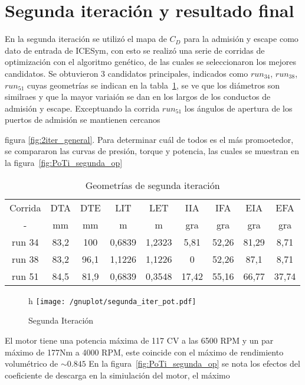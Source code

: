 \section{Segunda iteración y resultado final}
%
En la segunda iteración se utilizó el mapa de $C_D$ para la admisión y escape
como dato de entrada de ICESym, con esto se realizó una serie de corridas de
optimización con el algoritmo genético, de las cuales se seleccionaron los
mejores candidatos.
%
Se obtuvieron 3 candidatos principales, indicados como \emph{$run_{34}$},
\emph{$run_{38}$}, \emph{$run_{51}$} cuyas geometrías se indican en la
tabla~\ref{tab:2iter_geom}, se ve que los diámetros son similraes y que la mayor variaión
se dan en los largos de los conductos de admisión y escape.
%
Exceptuando la corrida $run_{51}$ los ángulos de apertura de los puertos de
admisión se mantienen cercanos

figura \ref{fig:2iter_general}.
%
Para determinar cuál de todos es el más promoetedor, se compararon las curvas de
presión, torque y potencia, las cuales se muestran en la
figura~\ref{fig:PoTi_segunda_op}

\begin{table}
\centering
\begin{tabular}{ccccccccc} \toprule
  Corrida & DTA  & DTE  & LIT    & LET    & IIA   & IFA   & EIA   & EFA \\
  -       & mm   & mm   & m      & m      & gra   & gra   & gra   & gra \\ \midrule
  run 34  & 83,2 & 100  & 0,6839 & 1,2323 & 5,81  & 52,26 & 81,29 & 8,71 \\
  run 38  & 83,2 & 96,1 & 1,1226 & 1,1226 & 0     & 52,26 & 87,1  & 8,71 \\
  run 51  & 84,5 & 81,9 & 0,6839 & 0,3548 & 17,42 & 55,16 & 66,77 & 37,74 \\
\end{tabular}
\caption{Geometrías de segunda iteración}\label{tab:2iter_geom}
\end{table}

\begin{figure}{h}
  \centering
    \texttt{[image: /gnuplot/segunda\_iter\_pot.pdf]}
\caption{Segunda Iteración} \label{fig:primer_op}
\end{figure}


El motor tiene una potencia máxima de 117 CV a las 6500 RPM y un par máximo de
177Nm a 4000 RPM, este coincide con el máximo de rendimiento volumétrico de
$\sim 0.845$
%
En la figura~\ref{fig:PoTi_segunda_op} se nota los efectos del coeficiente de descarga
en la simiulación del motor, el máximo

